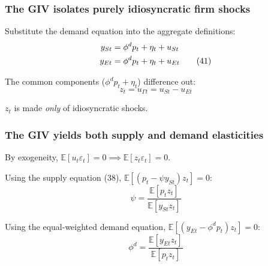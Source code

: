 \documentclass[aspectratio=169,11pt]{beamer}
\begin{document}
\begin{frame}
\frametitle{The GIV isolates purely idiosyncratic firm shocks}

\vspace{0.5cm}
Substitute the demand equation into the aggregate definitions:
\begin{align}
y_{St} &= \phi^d p_t + \eta_t + u_{St} \notag \\
y_{Et} &= \phi^d p_t + \eta_t + u_{Et} \tag{41}
\end{align}

\vspace{0.5cm}
The common components ($\phi^d p_t + \eta_t$) difference out:
\begin{equation}
z_t = u_{\Gamma t} = u_{St} - u_{Et} \tag{42}
\end{equation}

\vspace{0.5cm}
{\Large
$z_t$ is made \emph{only} of idiosyncratic shocks.
}

\end{frame}

\begin{frame}
\frametitle{The GIV yields both supply and demand elasticities}

\vspace{0.5cm}
By exogeneity, $\mathbb{E}[u_t \varepsilon_t] = 0 \implies \mathbb{E}[z_t \varepsilon_t] = 0$.

\vspace{0.5cm}
Using the supply equation (38), $\mathbb{E}[(p_t - \psi y_{St}) z_t] = 0$:
\begin{equation*}
\psi = \frac{\mathbb{E}[p_t z_t]}{\mathbb{E}[y_{St} z_t]}
\end{equation*}

\vspace{0.5cm}
Using the equal-weighted demand equation, $\mathbb{E}[(y_{Et} - \phi^d p_t) z_t] = 0$:
\begin{equation*}
\phi^d = \frac{\mathbb{E}[y_{Et} z_t]}{\mathbb{E}[p_t z_t]}
\end{equation*}

\end{frame}
\end{document}
